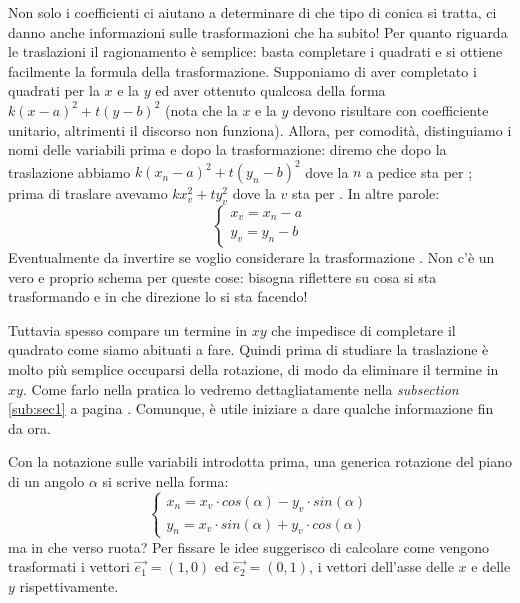 \documentclass[a4paper, oneside]{article}
\begin{document}
		Non solo i coefficienti ci aiutano a determinare di che tipo di conica si tratta, ci danno anche informazioni sulle trasformazioni che ha subito! Per quanto riguarda le traslazioni il ragionamento è semplice: basta completare i quadrati e si ottiene facilmente la formula della trasformazione. Supponiamo di aver completato i quadrati per la $x$ e la $y$ ed aver ottenuto qualcosa della forma $k(x-a)^2 + t(y-b)^2$ (nota che la $x$ e la $y$ devono risultare con coefficiente unitario, altrimenti il discorso non funziona). Allora, per comodità, distinguiamo i nomi delle variabili prima e dopo la trasformazione: diremo che dopo la traslazione abbiamo $k(x_n-a)^2 + t(y_n-b)^2$ dove la $n$ a pedice sta per ; prima di traslare avevamo $kx_v^2 + ty_v^2$ dove la $v$ sta per . In altre parole:
		\begin{equation*}
			\left\{
			\begin{array}{c}
				x_v = x_n - a\\
				y_v = y_n - b
			\end{array} \right.
		\end{equation*}
		Eventualmente da invertire se voglio considerare la trasformazione . Non c'è un vero e proprio schema per queste cose: bisogna riflettere su cosa si sta trasformando e in che direzione lo si sta facendo!
		
		Tuttavia spesso compare un termine in $xy$ che impedisce di completare il quadrato come siamo abituati a fare. Quindi prima di studiare la traslazione è molto più semplice occuparsi della rotazione, di modo da eliminare il termine in $xy$. Come farlo nella pratica lo vedremo dettagliatamente nella \emph{subsection} \ref{sub:sec1} a pagina \pageref{sub:sec1}. Comunque, è utile iniziare a dare qualche informazione fin da ora.
		
		Con la notazione sulle variabili introdotta prima, una generica rotazione del piano di un angolo $\alpha$ si scrive nella forma:
		\begin{equation*}
			\left\{
			\begin{array}{c}
				x_n = x_v\cdot cos(\alpha) - y_v\cdot sin(\alpha) \\
				y_n = x_v\cdot sin(\alpha) + y_v\cdot cos(\alpha)
			\end{array} \right.
		\end{equation*}
		ma in che verso ruota? Per fissare le idee suggerisco di calcolare come vengono trasformati i vettori $\overrightarrow{e_1}=(1,0)$ ed $\overrightarrow{e_2}=(0,1)$, i vettori dell'asse delle $x$ e delle $y$ rispettivamente.
		
\end{document}
